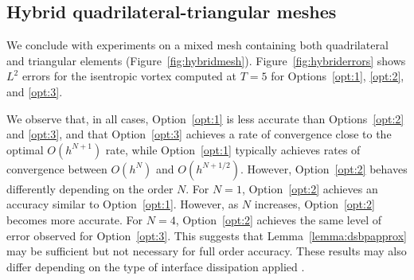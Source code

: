 \documentclass{svjour3}                     %
\begin{document}


\subsection{Hybrid quadrilateral-triangular meshes}

We conclude with experiments on a mixed mesh containing both quadrilateral and triangular elements (Figure~\ref{fig:hybridmesh}).  Figure~\ref{fig:hybriderrors} shows $L^2$ errors for the isentropic vortex computed at $T = 5$ for Options~\ref{opt:1}, \ref{opt:2}, and \ref{opt:3}.  

We observe that, in all cases, Option~\ref{opt:1} is less accurate than Options~\ref{opt:2} and \ref{opt:3}, and that Option~\ref{opt:3} achieves a rate of convergence close to the optimal $O(h^{N+1})$ rate, while Option~\ref{opt:1} typically achieves rates of convergence between $O(h^N)$ and $O(h^{N+1/2})$.  However, Option~\ref{opt:2} behaves differently depending on the order $N$.  For $N = 1$, Option~\ref{opt:2} achieves an accuracy similar to Option~\ref{opt:1}.  However, as $N$ increases, Option~\ref{opt:2} becomes more accurate.  For $N=4$, Option~\ref{opt:2} achieves the same level of error observed for Option~\ref{opt:3}.  This suggests that Lemma~\ref{lemma:dsbpapprox} may be sufficient but not necessary for full order accuracy.  These results may also differ depending on the type of interface dissipation applied \cite{hindenlang2019order}.

\end{document}
